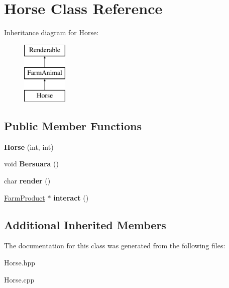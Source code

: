 \hypertarget{class_horse}{}\section{Horse Class Reference}
\label{class_horse}
Inheritance diagram for Horse\+:\begin{figure}[H]
\begin{center}
\leavevmode
\includegraphics[height=3.000000cm]{class_horse}
\end{center}
\end{figure}
\subsection*{Public Member Functions}
\begin{DoxyCompactItemize}
\item 
\mbox{\label{class_horse_a76077cef5c4696a4ba1d0b94f86d8955}} 
{\bfseries Horse} (int, int)
\item 
\mbox{\label{class_horse_a259b1851e05aa95c0bfd4715ede691c6}} 
void {\bfseries Bersuara} ()
\item 
\mbox{\label{class_horse_a40abd65ce7f30c72bd420267149543d3}} 
char {\bfseries render} ()
\item 
\mbox{\label{class_horse_a36a30d55411108eb6a1f1bff81a17887}} 
\mbox{\hyperlink{class_farm_product}{Farm\+Product}} $\ast$ {\bfseries interact} ()
\end{DoxyCompactItemize}
\subsection*{Additional Inherited Members}


The documentation for this class was generated from the following files\+:\begin{DoxyCompactItemize}
\item 
Horse.\+hpp\item 
Horse.\+cpp\end{DoxyCompactItemize}
